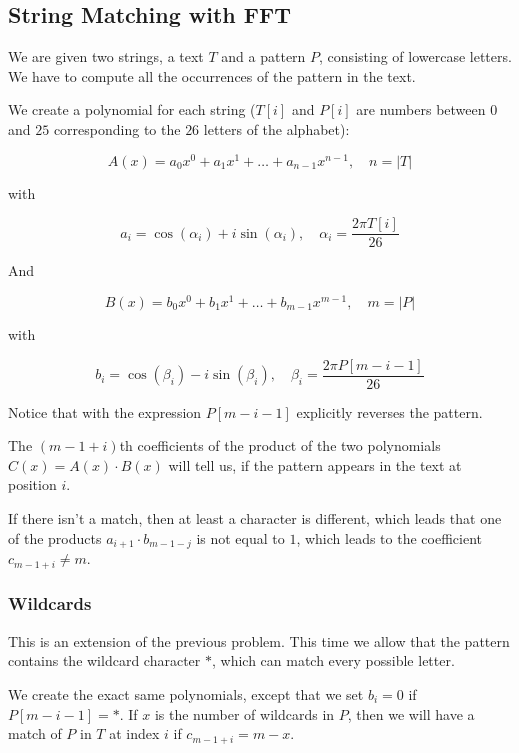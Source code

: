 \subsection{String Matching with FFT}

We are given two strings, a text $T$ and a pattern $P$, consisting of lowercase letters. We have to compute all the occurrences of the pattern in the text.

We create a polynomial for each string ($T[i]$ and $P[i]$ are numbers between $0$ and $25$ corresponding to the $26$ letters of the alphabet):

\[A(x) = a_0 x^0 + a_1 x^1 + \dots + a_{n-1} x^{n-1}, \quad n = |T|\]

with

\[a_i = \cos(\alpha_i) + i \sin(\alpha_i), \quad \alpha_i = \frac{2 \pi T[i]}{26}\]

And

\[B(x) = b_0 x^0 + b_1 x^1 + \dots + b_{m-1} x^{m-1}, \quad m = |P|\]

with

\[b_i = \cos(\beta_i) - i \sin(\beta_i), \quad \beta_i = \frac{2 \pi P[m-i-1]}{26}\]

Notice that with the expression $P[m-i-1]$ explicitly reverses the pattern.

The $(m-1+i)$th coefficients of the product of the two polynomials $C(x) = A(x) \cdot B(x)$ will tell us, if the pattern appears in the text at position $i$.

If there isn't a match, then at least a character is different, which leads that one of the products $a_{i+1} \cdot b_{m-1-j}$ is not equal to $1$, which leads to the coefficient $c_{m-1+i} \ne m$.

\subsubsection{Wildcards}

This is an extension of the previous problem. This time we allow that the pattern contains the wildcard character $*$, which can match every possible letter.

We create the exact same polynomials, except that we set $b_i = 0$ if $P[m-i-1] = *$. If $x$ is the number of wildcards in $P$, then we will have a match of $P$ in $T$ at index $i$ if $c_{m-1+i} = m - x$.
